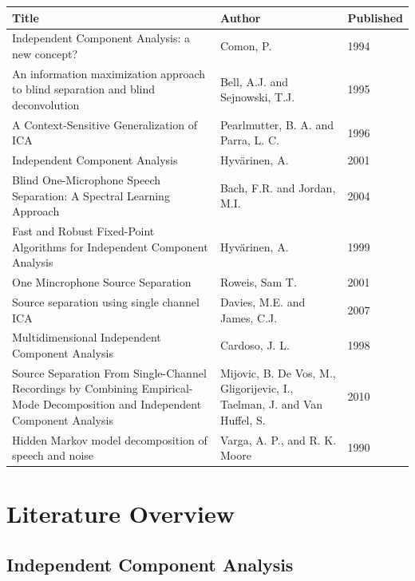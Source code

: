 \begin{table} [ht]
    \begin{tabular}{|p{6cm}|p{4cm}|p{2cm}|}
        \hline
        \textbf{Title} & \textbf{Author} & \textbf{Published} \\ \hline
        Independent Component Analysis: a new concept? & Comon, P. & 1994\\ \hline
        An information maximization approach to blind separation and blind deconvolution  & Bell, A.J. and Sejnowski, T.J. & 1995\\ \hline
        A Context-Sensitive Generalization of ICA & Pearlmutter, B. A. and Parra, L. C. & 1996\\ \hline
        Independent Component Analysis & Hyvärinen, A. & 2001\\ \hline
        Blind One-Microphone Speech Separation: A Spectral Learning Approach & Bach, F.R. and Jordan, M.I. & 2004\\ \hline
        Fast and Robust Fixed-Point Algorithms for Independent Component Analysis & Hyvärinen, A. & 1999\\ \hline
        One Mincrophone Source Separation & Roweis, Sam T. & 2001\\ \hline
        Source separation using single channel ICA & Davies, M.E. and James, C.J. & 2007 \\ \hline
        Multidimensional Independent Component Analysis& Cardoso, J. L. & 1998\\ \hline
        Source Separation From Single-Channel Recordings by Combining Empirical-Mode Decomposition and Independent Component Analysis & Mijovic, B. De Vos, M., Gligorijevic, I., Taelman, J. and Van Huffel, S. & 2010\\ \hline
        Hidden Markov model decomposition of speech and noise & Varga, A. P., and R. K. Moore & 1990\\
        \hline
    \end{tabular}
\end{table}



\clearpage
\section{Literature Overview}\label{overview}



\subsection{Independent Component Analysis} %

